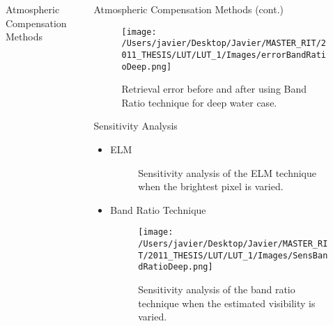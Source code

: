 \documentclass[mathserif]{beamer}
\begin{document}
\begin{frame}{}
\begin{columns}[t]
\begin{column}{.3\linewidth}
\begin{block}{Atmospheric Compensation Methods}
\begin{itemize}
\end{itemize}
\vspace{1cm}
\end{block}
\end{column}
 \begin{column}{.3\linewidth}
\begin{block}{Atmospheric Compensation Methods (cont.)}
   \begin{figure}[h!]
 \centering
   \texttt{[image: /Users/javier/Desktop/Javier/MASTER\_RIT/2011\_THESIS/LUT/LUT\_1/Images/errorBandRatioDeep.png]}
 	\caption{\label{fig:BandRatioError}Retrieval error before and after using Band Ratio technique for deep water case.}
   \end{figure} 
\end{block}  
\begin{block}{Sensitivity Analysis}
\begin{itemize}
\item ELM\\
\begin{figure}[t]
\centering
           \caption{\label{fig:ELMsens} Sensitivity analysis of the ELM technique when the brightest pixel is varied.}
\end{figure}
\item Band Ratio Technique\\
\begin{figure}
	\texttt{[image: /Users/javier/Desktop/Javier/MASTER\_RIT/2011\_THESIS/LUT/LUT\_1/Images/SensBandRatioDeep.png]}
	\caption{\label{BandRationSens}  Sensitivity analysis of the band ratio technique when the estimated visibility is varied.}
\end{figure}
\end{itemize}
\end{block}



\end{column}
\end{columns}
\end{frame}
\end{document}
